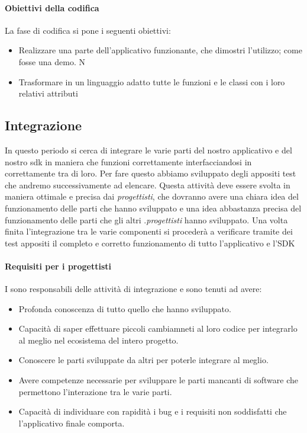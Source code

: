 \paragraph{Obiettivi della codifica}
La fase di codifica si pone i seguenti obiettivi:
\begin{itemize}
\item Realizzare una parte dell'applicativo funzionante, che dimostri l'utilizzo; come fosse una demo. N
\item Trasformare in un linguaggio adatto tutte le funzioni e le classi con i loro relativi attributi 
\end{itemize}

\subsection{Integrazione}
In questo periodo si cerca di integrare le varie parti del nostro applicativo e del nostro sdk in maniera che funzioni correttamente interfacciandosi in  correttamente tra di loro. Per fare questo abbiamo sviluppato degli appositi test che andremo successivamente ad elencare.
Questa attività deve essere svolta in maniera ottimale e precisa dai \textit{progettisti}, che dovranno avere una chiara idea del funzionamento delle parti che hanno sviluppato e una idea abbastanza precisa del funzionamento delle parti che gli altri .\textit{progettisti} hanno sviluppato. Una volta finita l'integrazione tra le varie componenti si procederà a verificare tramite dei test appositi il completo e corretto funzionamento di tutto l'applicativo e l'SDK

\paragraph{Requisiti per i progettisti}
I \textit{\ProgP} sono responsabili delle attività di integrazione e sono tenuti ad avere:
\begin{itemize}
\item
Profonda conoscenza di tutto quello che hanno sviluppato.
\item
Capacità di saper effettuare piccoli cambiamneti al loro codice per integrarlo al meglio nel ecosistema del intero progetto.
\item
Conoscere le parti sviluppate da altri per poterle integrare al meglio.
\item
Avere competenze necessarie per sviluppare le parti mancanti di software che permettono l'interazione tra le varie parti.
\item
Capacità di individuare con rapidità i bug e i requisiti non soddisfatti che l'applicativo finale comporta.
\end{itemize}

